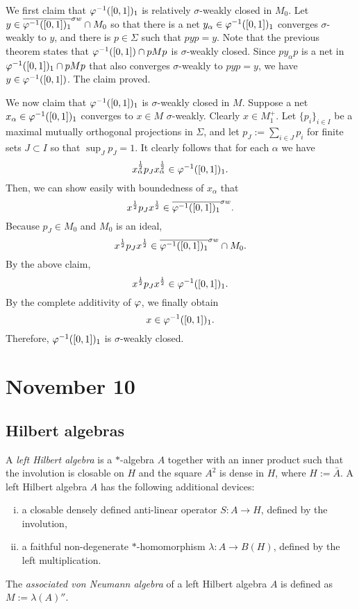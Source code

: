 \documentclass{../../small}
\begin{document}
\begin{pf}
We first claim that $\varphi^{-1}([0,1])_1$ is relatively $\sigma$-weakly closed in $M_0$.
Let $y\in\overline{\varphi^{-1}([0,1])_1}^{\sigma w}\cap M_0$ so that there is a net $y_\alpha\in\varphi^{-1}([0,1])_1$ converges $\sigma$-weakly to $y$, and there is $p\in\Sigma$ such that $pyp=y$.
Note that the previous theorem states that $\varphi^{-1}([0,1])\cap pMp$ is $\sigma$-weakly closed.
Since $py_\alpha p$ is a net in $\varphi^{-1}([0,1])_1\cap pMp$ that also converges $\sigma$-weakly to $pyp=y$, we have $y\in\varphi^{-1}([0,1])$.
The claim proved.

We now claim that $\varphi^{-1}([0,1])_1$ is $\sigma$-weakly closed in $M$.
Suppose a net $x_\alpha\in\varphi^{-1}([0,1])_1$ converges to $x\in M$ $\sigma$-weakly.
Clearly $x\in M_1^+$.
Let $\{p_i\}_{i\in I}$ be a maximal mutually orthogonal projections in $\Sigma$, and let $p_J:=\sum_{i\in J}p_i$ for finite sets $J\subset I$ so that $\sup_Jp_J=1$.
It clearly follows that for each $\alpha$ we have
\[x_\alpha^{\frac12}p_Jx_\alpha^{\frac12}\in\varphi^{-1}([0,1])_1.\]
Then, we can show easily with boundedness of $x_\alpha$ that
\[x^{\frac12}p_Jx^{\frac12}\in\overline{\varphi^{-1}([0,1])_1}^{\sigma w}.\]
Because $p_J\in M_0$ and $M_0$ is an ideal, 
\[x^{\frac12}p_Jx^{\frac12}\in\overline{\varphi^{-1}([0,1])_1}^{\sigma w}\cap M_0.\]
By the above claim,
\[x^{\frac12}p_Jx^{\frac12}\in\varphi^{-1}([0,1])_1.\]
By the complete additivity of $\varphi$, we finally obtain
\[x\in\varphi^{-1}([0,1])_1.\]
Therefore, $\varphi^{-1}([0,1])_1$ is $\sigma$-weakly closed.
\end{pf}





\newpage
\section{November 10}
\subsection{Hilbert algebras}

\begin{defn}
A \emph{left Hilbert algebra} is a $*$-algebra $A$ together with an inner product such that the involution is closable on $H$ and the square $A^2$ is dense in $H$, where $H:=\bar A$.
A left Hilbert algebra $A$ has the following additional devices:
\begin{enumerate}[(i)]
\item a closable densely defined anti-linear operator $S:A\to H$, defined by the involution,
\item a faithful non-degenerate $*$-homomorphism $\lambda:A\to B(H)$, defined by the left multiplication.
\end{enumerate}
The \emph{associated von Neumann algebra} of a left Hilbert algebra $A$ is defined as $M:=\lambda(A)''$.
\end{defn}
\end{document}
